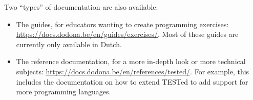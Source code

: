 \documentclass[./main]{subfiles}
\begin{document}
Two ``types'' of documentation are also available:

\begin{itemize}
    \item The guides, for educators wanting to create programming exercises: \url{https://docs.dodona.be/en/guides/exercises/}.
          Most of these guides are currently only available in Dutch.
    \item The reference documentation, for a more in-depth look or more technical subjects: \url{https://docs.dodona.be/en/references/tested/}.
          For example, this includes the documentation on how to extend TESTed to add support for more programming languages.
\end{itemize}
\end{document}
